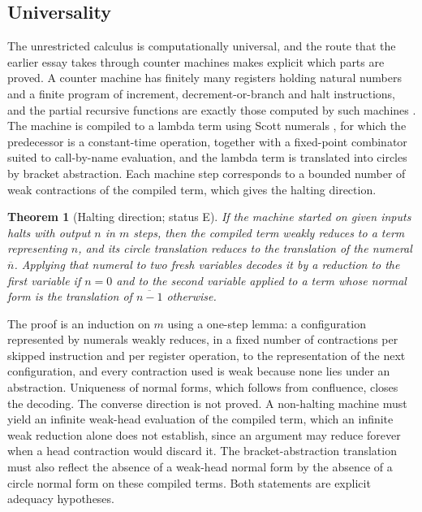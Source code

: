 \documentclass[11pt]{article}
\newtheorem{theorem}{Theorem}[section]
\theoremstyle{definition}
\theoremstyle{remark}
\newcommand{\Et}{status E}
\begin{document}
\subsection{Universality}

The unrestricted calculus is computationally universal, and the route that the earlier essay takes through counter machines makes explicit which parts are proved. A counter machine has finitely many registers holding natural numbers and a finite program of increment, decrement-or-branch and halt instructions, and the partial recursive functions are exactly those computed by such machines \citep{minsky1967}. The machine is compiled to a lambda term using Scott numerals \citep{mogensen1992}, for which the predecessor is a constant-time operation, together with a fixed-point combinator suited to call-by-name evaluation, and the lambda term is translated into circles by bracket abstraction. Each machine step corresponds to a bounded number of weak contractions of the compiled term, which gives the halting direction.

\begin{theorem}[Halting direction; \Et]\label{thm:halting}
If the machine started on given inputs halts with output $n$ in $m$ steps, then the compiled term weakly reduces to a term representing $n$, and its circle translation reduces to the translation of the numeral $\overline{n}$. Applying that numeral to two fresh variables decodes it by a reduction to the first variable if $n=0$ and to the second variable applied to a term whose normal form is the translation of $\overline{n-1}$ otherwise.
\end{theorem}

The proof is an induction on $m$ using a one-step lemma: a configuration represented by numerals weakly reduces, in a fixed number of contractions per skipped instruction and per register operation, to the representation of the next configuration, and every contraction used is weak because none lies under an abstraction. Uniqueness of normal forms, which follows from confluence, closes the decoding. The converse direction is not proved. A non-halting machine must yield an infinite weak-head evaluation of the compiled term, which an infinite weak reduction alone does not establish, since an argument may reduce forever when a head contraction would discard it. The bracket-abstraction translation must also reflect the absence of a weak-head normal form by the absence of a circle normal form on these compiled terms. Both statements are explicit adequacy hypotheses.
\end{document}
